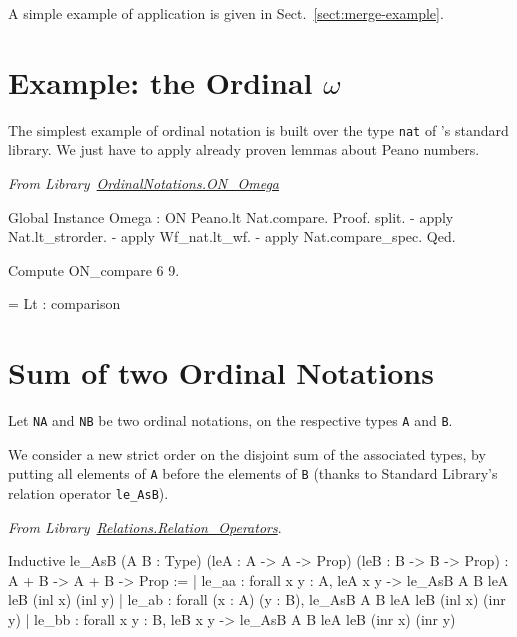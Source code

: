 A simple example of application is given in Sect.~\vref{sect:merge-example}.


\section{Example: the Ordinal \texorpdfstring{$\omega$}{omega}}




The simplest example of ordinal notation is built over the type \texttt{nat} of \coq's standard library. We just have to apply already proven lemmas about Peano numbers.

\vspace{4pt}
\noindent\emph{From Library~\href{../theories/html/hydras.OrdinalNotations/ON_Omega.html}{OrdinalNotations.ON\_Omega}}


\begin{Coqsrc}
Global Instance Omega : ON  Peano.lt Nat.compare.
Proof.
 split.
 - apply Nat.lt_strorder.
 - apply Wf_nat.lt_wf.
 - apply Nat.compare_spec.
Qed.

Compute ON_compare 6 9.
\end{Coqsrc}

\begin{Coqanswer}
     = Lt
     : comparison
\end{Coqanswer}

\section{Sum of  two Ordinal Notations}

Let \texttt{NA} and \texttt{NB} be two ordinal notations, on the respective types \texttt{A} and \texttt{B}.

 We consider a new strict order
on the disjoint sum of the associated types, by putting all elements of \texttt{A} before the elements of \texttt{B} (thanks to Standard Library's relation operator \texttt{le\_AsB}).

\vspace{4pt}
\noindent
\emph{From Library~\href{https://coq.inria.fr/distrib/current/stdlib/Coq.Relations.Relation_Operators.html}{Relations.Relation\_Operators}}.

\begin{Coqanswer}
Inductive
le_AsB (A B : Type) (leA : A -> A -> Prop) (leB : B -> B -> Prop)
  : A + B -> A + B -> Prop :=
| le_aa : forall x y : A, leA x y -> le_AsB A B leA leB (inl x) (inl y)
| le_ab : forall (x : A) (y : B), le_AsB A B leA leB (inl x) (inr y)
| le_bb : forall x y : B, leB x y -> le_AsB A B leA leB (inr x) (inr y)
\end{Coqanswer}


